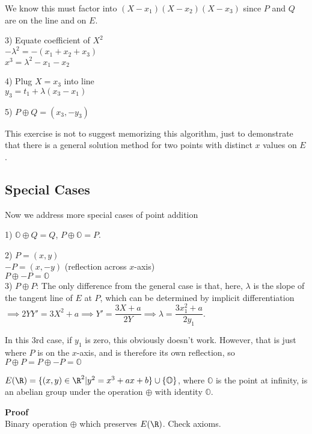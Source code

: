 \documentclass[10pt]{article}
\renewcommand{\O}{\mathbb{O}}
\begin{document}
We know this must factor into $(X-x_1)(X-x_2)(X-x_3)$ since $P$ and $Q$ are on the line and on $E$.

3) Equate coefficient of $X^2$\\
$-\lambda^2 = -(x_1 + x_2 + x_3)$\\
$x^3 = \lambda^2 - x_1 - x_2$

4) Plug $X = x_3$ into line\\
$y_3 = t_1 + \lambda(x_3 - x_1)$

5) $P\oplus Q = (x_3, -y_3)$

\begin{rmk}
    This exercise is not to suggest memorizing this algorithm, just to demonstrate that there is a general solution method for two points with distinct $x$ values on $E$.
\end{rmk}

\subsection{Special Cases} Now we address more special cases of point addition

1) $\O \oplus Q = Q$, $P \oplus \O = P$.

2) $P = (x, y)$\\
$-P = (x, -y)$ (reflection across $x$-axis)\\
$P \oplus -P = \O$\\

3) $P \oplus P$: The only difference from the general case is that, here, $\lambda$ is the slope of the tangent line of $E$ at $P$, which can be determined by implicit differentiation $\implies 2YY' = 3X^2 + a \implies Y'  = \dfrac{3X + a}{2Y} \implies \lambda = \dfrac{3x_1^2 + a}{2y_1}$. 

\begin{rmk}
    In this 3rd case, if $y_1$ is zero, this obviously doesn't work. However, that is just where $P$ is on the $x$-axis, and is therefore its own reflection, so $P \oplus P = P \oplus -P = \O$
\end{rmk}

\begin{prop}
    $E(\R) = \{(x, y) \in \R^2 | y^2 = x^3 + ax + b\} \cup \{\O\}$, where $\O$ is the point at infinity, is an abelian group under the operation $\oplus$ with identity $\O$. 
\end{prop}
\textbf{Proof}\\
Binary operation $\oplus$ which preserves $E(\R)$. Check axioms.
\end{document}
